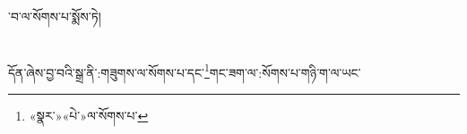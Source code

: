 ་བ་ལ་སོགས་པ་སྨོས་ཏེ།\chapter{ }དོན་ཞེས་བྱ་བའི་སྒྲ་ནི་:གཟུགས་ལ་སོགས་པ་དང་\footnote{«སྣར་»«པེ་»ལ་སོགས་པ་}གང་ཟག་ལ་:སོགས་པ་གཉི་ག་ལ་ཡང་\footn